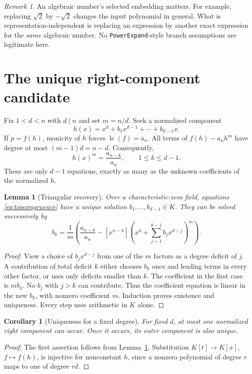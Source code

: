 \documentclass[11pt,a4paper]{article}
\numberwithin{equation}{section}
\newtheorem{lemma}[theorem]{Lemma}
\newtheorem{corollary}[theorem]{Corollary}
\theoremstyle{definition}
\theoremstyle{remark}
\newtheorem{remark}[theorem]{Remark}
\newcommand{\lc}{\operatorname{lc}}
\newcommand{\code}[1]{\texttt{#1}}
\begin{document}
\begin{remark}
An algebraic number's selected embedding matters. For example, replacing
$\sqrt2$ by $-\sqrt2$ changes the input polynomial in general. What is
representation-independent is replacing an expression by another exact
expression for the \emph{same} algebraic number. No \code{PowerExpand}-style
branch assumptions are legitimate here.
\end{remark}

\section{The unique right-component candidate}
\label{sec:candidate}
Fix $1<d<n$ with $d\mid n$ and set $m=n/d$. Seek a normalized component
\begin{equation}
 h(x)=x^d+b_1x^{d-1}+\cdots+b_{d-1}x.
 \label{eq:h}
\end{equation}
If $p=f(h)$, monicity of $h$ forces $\lc(f)=a_n$. All terms of
$f(h)-a_nh^m$ have degree at most $(m-1)d=n-d$. Consequently,
\begin{equation}
 [x^{n-k}]h(x)^m=\frac{a_{n-k}}{a_n},
 \qquad 1\le k\le d-1.
 \label{eq:topcongruence}
\end{equation}
These are only $d-1$ equations, exactly as many as the unknown coefficients
of the normalized $h$.

\begin{lemma}[Triangular recovery]
\label{lem:triangular}
Over a characteristic-zero field, equations \eqref{eq:topcongruence} have a
unique solution $b_1,\ldots,b_{d-1}\in K$. They can be solved successively by
\begin{equation}
 b_k=\frac1m\left(\frac{a_{n-k}}{a_n}-
 [x^{n-k}]\left(x^d+\sum_{j=1}^{k-1}b_jx^{d-j}\right)^m\right).
 \label{eq:triangular}
\end{equation}
\end{lemma}
\begin{proof}
View a choice of $b_jx^{d-j}$ from one of the $m$ factors as a degree deficit
of $j$. A contribution of total deficit $k$ either chooses $b_k$ once and
leading terms in every other factor, or uses only deficits smaller than $k$.
The coefficient in the first case is $mb_k$. No $b_j$ with $j>k$ can contribute.
Thus the coefficient equation is linear in the new $b_k$, with nonzero
coefficient $m$. Induction proves existence and uniqueness. Every step uses
arithmetic in $K$ alone.
\end{proof}

\begin{corollary}[Uniqueness for a fixed degree]
\label{cor:unique}
For fixed $d$, at most one normalized right component can occur. Once it
occurs, its outer component is also unique.
\end{corollary}
\begin{proof}
The first assertion follows from Lemma~\ref{lem:triangular}. Substitution
$K[t]\to K[x]$, $f\mapsto f(h)$, is injective for nonconstant $h$, since a
nonzero polynomial of degree $r$ maps to one of degree $rd$.
\end{proof}
\end{document}
